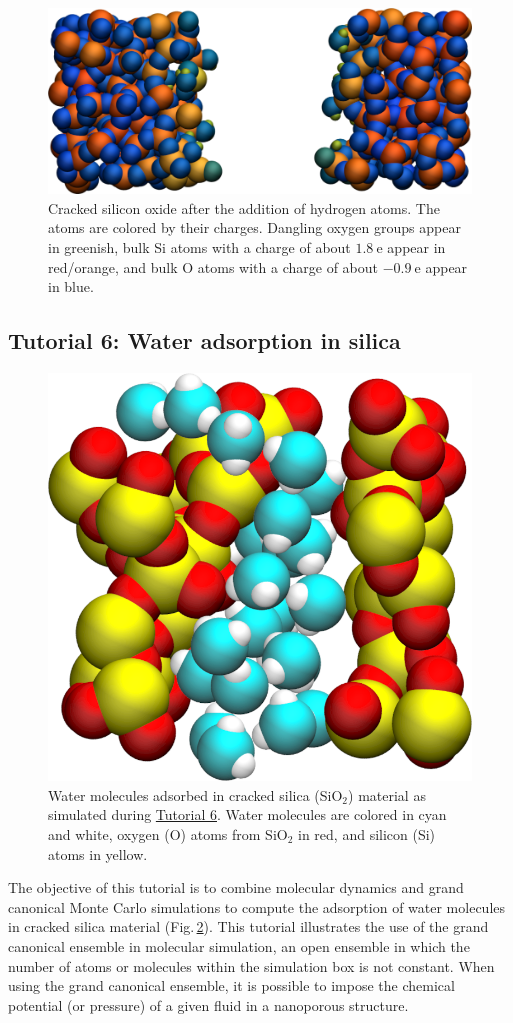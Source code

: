 \documentclass[9pt,tutorial]{livecoms}
\begin{document}
\begin{figure}
\includegraphics[width=\linewidth]{SIO-decorated}
\caption{Cracked silicon oxide after the addition of hydrogen atoms. The atoms
are colored by their charges. Dangling oxygen groups appear in greenish, bulk
Si atoms with a charge of about $1.8~\text{e}$  appear in red/orange, and bulk
O atoms with a charge of about $-0.9 ~ \text{e}$ appear in blue.}
\label{fig:SIO-decorated}
\end{figure}

\subsection{Tutorial 6: Water adsorption in silica}
\label{gcmc-silica-label}

\begin{figure}
\centering
\includegraphics[width=0.55\linewidth]{GCMC}
\caption{Water molecules adsorbed in cracked silica (SiO$_2$) material as simulated
during \hyperref[gcmc-silica-label]{Tutorial 6}. Water molecules are colored in
cyan and white, oxygen (O) atoms from SiO$_2$ in red, and silicon (Si) atoms in yellow.}
\label{fig:GCMC}
\end{figure}

\noindent The objective of this tutorial is to combine molecular dynamics and
grand canonical Monte Carlo simulations to compute the adsorption of water
molecules in cracked silica material (Fig.\,\ref{fig:GCMC}). This tutorial
illustrates the use of the grand canonical ensemble in molecular simulation, an
open ensemble in which the number of atoms or molecules within the simulation
box is not constant. When using the grand canonical ensemble, it is possible to
impose the chemical potential (or pressure) of a given fluid in a nanoporous structure.
\end{document}
